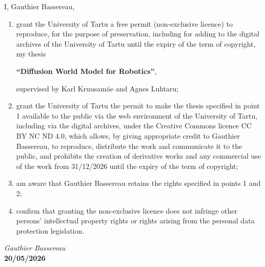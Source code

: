 \documentclass[12pt]{report}
\begin{document}
I, Gauthier Bassereau,
\begin{enumerate}
\item grant the University of Tartu a free permit (non-exclusive licence) to reproduce, for the purpose of preservation, including for adding to the digital archives of the University of Tartu until the expiry of the term of copyright, my thesis
\begin{center}
\textbf{``Diffusion World Model for Robotics''},
\end{center}
supervised by Karl Kruusamäe and Agnes Luhtaru;
\item grant the University of Tartu the permit to make the thesis specified in point 1 available to the public via the web environment of the University of Tartu, including via the digital archives, under the Creative Commons licence CC BY NC ND 4.0, which allows, by giving appropriate credit to Gauthier Bassereau, to reproduce, distribute the work and communicate it to the public, and prohibits the creation of derivative works and any commercial use of the work from 31/12/2026 until the expiry of the term of copyright;
\item am aware that Gauthier Bassereau retains the rights specified in points 1 and 2;
\item confirm that granting the non-exclusive licence does not infringe other persons' intellectual property rights or rights arising from the personal data protection legislation.
\end{enumerate}
\vspace{2cm}
\textit{Gauthier Bassereau}
\\
\textbf{20/05/2026}
\end{document}
